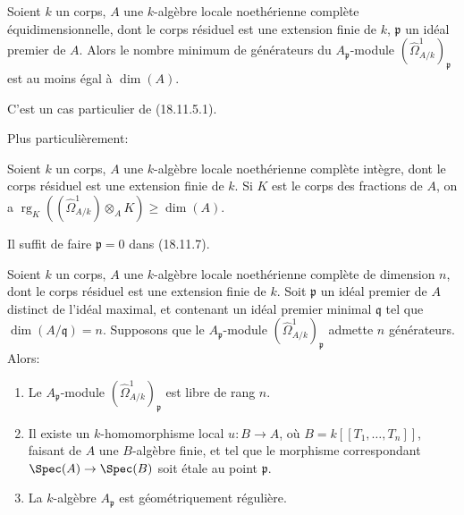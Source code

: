 \begin{corollary}[18.11.7]
\label{IV.18.11.7}
Soient $k$ un corps, $A$ une $k$-algèbre locale noethérienne complète équidimensionnelle, dont le corps résiduel est une extension finie de $k$, $\mathfrak p$ un idéal premier de $A$. Alors le nombre minimum de générateurs du $A_{\mathfrak p}$-module $(\hat{\Omega}^1_{A/k})_{\mathfrak p}$ est au moins égal à $\dim(A)$.
\end{corollary}

C'est un cas particulier de (18.11.5.1).

Plus particulièrement:


\begin{corollary}[18.11.8]
\label{IV.18.11.8}
Soient $k$ un corps, $A$ une $k$-algèbre locale noethérienne complète \textup{intègre}, dont le corps résiduel est une extension finie de $k$. Si $K$ est le corps des fractions de $A$, on a
$\operatorname{rg}_K((\hat{\Omega}^1_{A/k})\otimes_A K)\geq\dim(A)$.
\end{corollary}

Il suffit de faire $\mathfrak p=0$ dans (18.11.7).

\begin{corollary}[18.11.9]
\label{IV.18.11.9}
Soient $k$ un corps, $A$ une $k$-algèbre locale noethérienne complète de dimension $n$, dont le corps résiduel est une extension finie de $k$. Soit $\mathfrak p$ un idéal premier de $A$ distinct de l'idéal maximal, et contenant un idéal premier minimal $\mathfrak q$ tel que $\dim(A/\mathfrak q)=n$. Supposons que le $A_{\mathfrak p}$-module $(\hat{\Omega}^1_{A/k})_{\mathfrak p}$ admette $n$ générateurs. Alors:
\begin{enumerate}
  \item[\textup{(i)}] Le $A_{\mathfrak p}$-module $(\hat{\Omega}^1_{A/k})_{\mathfrak p}$ est libre de rang $n$.
  \item[\textup{(ii)}] Il existe un $k$-homomorphisme local $u:B\to A$, où $B=k[[T_1,\ldots,T_n]]$, faisant de $A$ une $B$-algèbre finie, et tel que le morphisme correspondant $\Spec(A)\to\Spec(B)$ soit étale au point $\mathfrak p$.
  \item[\textup{(iii)}] La $k$-algèbre $A_{\mathfrak p}$ est géométriquement régulière.
\end{enumerate}
\end{corollary}

